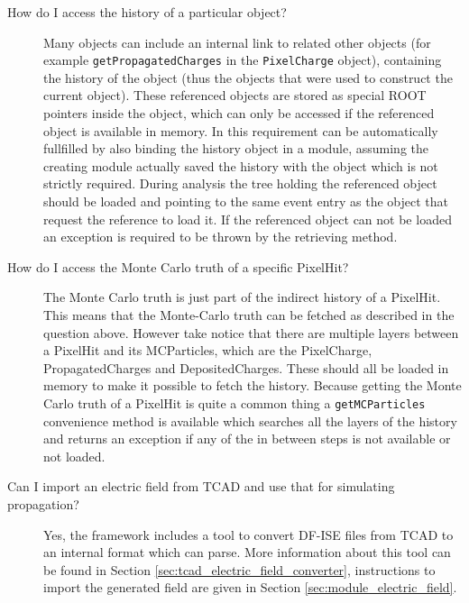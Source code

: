 \begin{description}
\item[How do I access the history of a particular object?] Many objects can include an internal link to related other objects (for example \texttt{getPropagatedCharges} in the \texttt{PixelCharge} object), containing the history of the object (thus the objects that were used to construct the current object). These referenced objects are stored as special ROOT pointers inside the object, which can only be accessed if the referenced object is available in memory. In \apsq this requirement can be automatically fullfilled by also binding the history object in a module, assuming the creating module actually saved the history with the object which is not strictly required. During analysis the tree holding the referenced object should be loaded and pointing to the same event entry as the object that request the reference to load it. If the referenced object can not be loaded an exception is required to be thrown by the retrieving method.
\item[How do I access the Monte Carlo truth of a specific PixelHit?] The Monte Carlo truth is just part of the indirect history of a PixelHit. This means that the Monte-Carlo truth can be fetched as described in the question above. However take notice that there are multiple layers between a PixelHit and its MCParticles, which are the PixelCharge, PropagatedCharges and DepositedCharges. These should all be loaded in memory to make it possible to fetch the history. Because getting the Monte Carlo truth of a PixelHit is quite a common thing a \texttt{getMCParticles} convenience method is available which searches all the layers of the history and returns an exception if any of the in between steps is not available or not loaded.
\item[Can I import an electric field from TCAD and use that for simulating propagation?] Yes, the framework includes a tool to convert DF-ISE files from TCAD to an internal format which \apsq can parse. More information about this tool can be found in Section \ref{sec:tcad_electric_field_converter}, instructions to import the generated field are given in Section \ref{sec:module_electric_field}.
\end{description}

